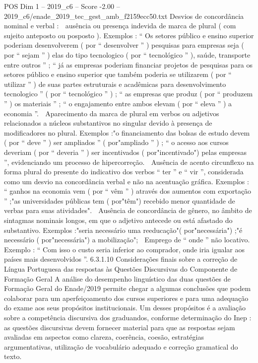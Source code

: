 \begin{textsample}{POS Dim 1 – 2019\_c6 – Score -2.00 – 2019\_c6/enade\_2019\_tec\_gest\_amb\_f2159ecc50.txt}
Desvios de concordância nominal e verbal :  ausência ou presença indevida de marca de plural ( com sujeito anteposto ou posposto ).
Exemplos : “ Os setores público e ensino superior poderiam desenvolverem ( por “ desenvolver ” ) pesquisas para empresas seja ( por “ sejam ” ) elas do tipo tecnologico ( por “ tecnológico ” ), saúde, transporte entre outros ” ; “ já as empresas poderiam financiar projetos de pesquisas para os setores público e ensino superior que também poderia se utilizarem ( por “ utilizar ” ) de suas partes estruturais e acadêmicas para desenvolvimento tecnologico ” ( por “ tecnológico ” ) ; “ as empresas que produz ( por “ produzem ” ) os materiais ” ; “ o engajamento entre ambos elevam ( por “ eleva ” ) a economia ”.  Aparecimento da marca de plural em verbos ou adjetivos relacionados a núcleos substantivos no singular devido à presença de modificadores no plural.
Exemplos :"o financiamento das bolsas de estudo devem ( por “ deve ” ) ser ampliados ” ( por"ampliado ” ) ; “ o acesso aos cursos deveriam ( por “ deveria ” ) ser incentivados ( por"incentivado") pelas empresas ”, evidenciando um processo de hipercorreção.  Ausência de acento circunflexo na forma plural do presente do indicativo dos verbos “ ter ” e “ vir ”, considerada como um desvio na concordância verbal e não na acentuação gráfica.
Exemplos : “ ganhos na economia vem ( por “ vêm ” ) através dos aumentos com exportação ” ;"as universidades públicas tem ( por"têm") recebido menor quantidade de verbas para suas atividades".  Ausência de concordância de gênero, no âmbito de sintagmas nominais longos, em que o adjetivo antecede ou está afastado do substantivo.
Exemplos :"seria necessário uma reeducação"( por"necessária") ;"é necessário ( por"necessária") a mobilização";  Emprego de “ onde ” não locativo.
Exemplo : “ Com isso o custo seria inferior ao comprador, onde iria igualar aos países mais desenvolvidos ”. 6.3.1.10 Considerações finais sobre a correção de Língua Portuguesa das respostas às Questões Discursivas do Componente de Formação Geral A análise do desempenho linguístico das duas questões de Formação Geral do Enade/2019 permite chegar a algumas conclusões que podem colaborar para um aperfeiçoamento dos cursos superiores e para uma adequação do exame aos seus propósitos institucionais.
Um desses propósitos é a avaliação sobre a competência discursiva dos graduandos, conforme determinação do Inep : as questões discursivas devem fornecer material para que as respostas sejam avaliadas em aspectos como clareza, coerência, coesão, estratégias argumentativas, utilização de vocabulário adequado e correção gramatical do texto.

\end{textsample}
